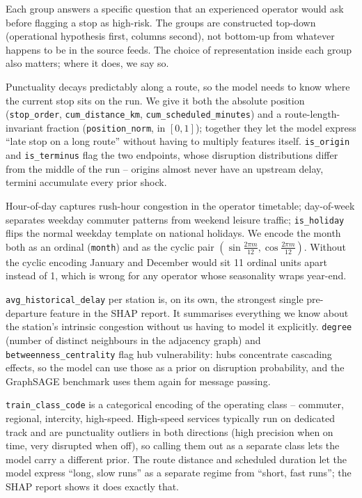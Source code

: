 Each group answers a specific question that an experienced operator would ask before flagging a stop as high-risk. The groups are constructed top-down (operational hypothesis first, columns second), not bottom-up from whatever happens to be in the source feeds. The choice of representation inside each group also matters; where it does, we say so.

\begin{description}[leftmargin=2.0em, style=nextline, itemsep=4pt]
    \item[Stop position (7 columns).] Punctuality decays predictably along a route, so the model needs to know where the current stop sits on the run. We give it both the absolute position (\texttt{stop\_order}, \texttt{cum\_distance\_km}, \texttt{cum\_scheduled\_minutes}) and a route-length-invariant fraction (\texttt{position\_norm}, in $[0, 1]$); together they let the model express ``late stop on a long route'' without having to multiply features itself. \texttt{is\_origin} and \texttt{is\_terminus} flag the two endpoints, whose disruption distributions differ from the middle of the run -- origins almost never have an upstream delay, termini accumulate every prior shock.
    \item[Stop time (6 columns).] Hour-of-day captures rush-hour congestion in the operator timetable; day-of-week separates weekday commuter patterns from weekend leisure traffic; \texttt{is\_holiday} flips the normal weekday template on national holidays. We encode the month both as an ordinal (\texttt{month}) and as the cyclic pair $(\sin\frac{2\pi m}{12}, \cos\frac{2\pi m}{12})$. Without the cyclic encoding January and December would sit 11 ordinal units apart instead of 1, which is wrong for any operator whose seasonality wraps year-end.
    \item[Station static (5 columns).] \texttt{avg\_historical\_delay} per station is, on its own, the strongest single pre-departure feature in the SHAP report. It summarises everything we know about the station's intrinsic congestion without us having to model it explicitly. \texttt{degree} (number of distinct neighbours in the adjacency graph) and \texttt{betweenness\_centrality} flag hub vulnerability: hubs concentrate cascading effects, so the model can use those as a prior on disruption probability, and the GraphSAGE benchmark uses them again for message passing.
    \item[Service identity (4 columns).] \texttt{train\_class\_code} is a categorical encoding of the operating class -- commuter, regional, intercity, high-speed. High-speed services typically run on dedicated track and are punctuality outliers in both directions (high precision when on time, very disrupted when off), so calling them out as a separate class lets the model carry a different prior. The route distance and scheduled duration let the model express ``long, slow runs'' as a separate regime from ``short, fast runs''; the SHAP report shows it does exactly that.

\end{description}

